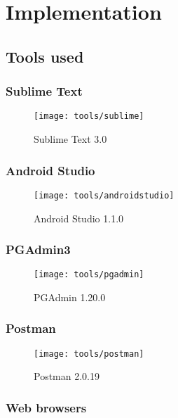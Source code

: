 \chapter{Implementation}

\section{Tools used}

\subsection*{Sublime Text}

\begin{figure}[p]
    \centering
    \texttt{[image: tools/sublime]}
    \caption{Sublime Text 3.0}
    \label{fig:sublime_text_image}
\end{figure}

\subsection*{Android Studio}

\begin{figure}[p]
    \centering
    \texttt{[image: tools/androidstudio]}
    \caption{Android Studio 1.1.0}
    \label{fig:android_studio_image}
\end{figure}

\subsection*{PGAdmin3}

\begin{figure}[p]
    \centering
    \texttt{[image: tools/pgadmin]}
    \caption{PGAdmin 1.20.0}
    \label{fig:pg_admin_image}
\end{figure}

\subsection*{Postman}

\begin{figure}[p]
    \centering
    \texttt{[image: tools/postman]}
    \caption{Postman 2.0.19}
    \label{fig:postman_image}
\end{figure}

\subsection*{Web browsers}

